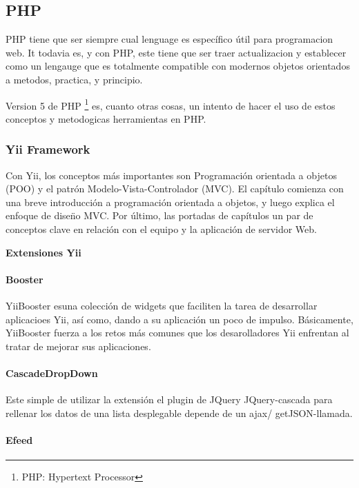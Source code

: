\subsection{PHP}

PHP tiene que ser siempre cual lenguage es espec\'{i}fico \'{u}til para programacion web. It todavia es, y con PHP, este
tiene que ser traer actualizacion y establecer como un lengauge que es totalmente compatible con modernos objetos orientados
a metodos, practica, y principio.

Version 5 de PHP \footnote{PHP: Hypertext Processor} es, cuanto otras cosas, un intento de hacer el uso de estos conceptos y 
metodogicas herramientas en PHP.\cite{reiersol2007php}

\subsubsection{Yii Framework}

Con Yii, los conceptos m\'{a}s importantes son Programaci\'{o}n orientada a objetos (POO) y el patr\'{o}n Modelo-Vista-Controlador
(MVC). El cap\'{i}tulo comienza con una breve introducci\'{o}n a programaci\'{o}n orientada a objetos, y luego explica el enfoque
de dise\"{n}o MVC. Por \'{u}ltimo, las portadas de cap\'{i}tulos un par de conceptos clave en relaci\'{o}n con el equipo y la 
aplicaci\'{o}n de servidor Web.\cite{ullman2013yii}

\textbf{Extensiones Yii}

\paragraph{\textbf{Booster}}

YiiBooster esuna colecci\'{o}n de widgets que faciliten la tarea de desarrollar aplicacioes Yii, as\'{i} como, dando a su 
aplicaci\'{o}n un poco de impulso. B\'{a}sicamente, YiiBooster fuerza a los retos m\'{a}s comunes que los desarolladores Yii
enfrentan al tratar de mejorar sus aplicaciones.

\paragraph{\textbf{CascadeDropDown}}

Este simple de utilizar la extensi\'{o}n el plugin de JQuery JQuery-cascada para rellenar los datos de una lista desplegable
depende de un ajax/ getJSON-llamada.

\paragraph{\textbf{Efeed}}

